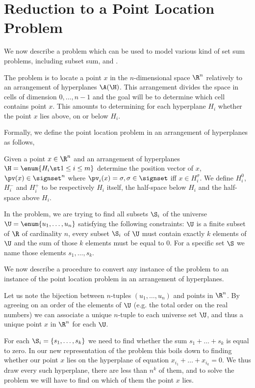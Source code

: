 \section{Reduction to a Point Location Problem}

We now describe a problem which can be used to model
various kind of set sum problems, including subset sum, \kSUM and \kLDT.

The problem is to locate a point \(x\) in the \(n\)-dimensional space \(\R^n\) relatively
to an arrangement of hyperplanes \(\A(\H)\). This arrangement divides the space
in cells of dimension \(0,\ldots,n-1\) and the goal will be to determine which
cell contains point \(x\). This amounts to determining for each
hyperplane \(H_i\) whether the point \(x\) lies above, on or below \(H_i\).

Formally, we define the point location problem in an arrangement of hyperplanes as
follows,

\begin{problem}
Given a point $x \in \R^n$ and an arrangement of hyperplanes $\H = \enum{ H_i
\st 1 \leq i \leq m }$ determine the position vector of $x$, $\pv(x) \in
\signset^n$ where $\pv_i(x) = \sigma, \sigma \in \signset$ iff $x \in
H_i^{\sigma}$. We define $H_i^{0}$, $H_i^{-}$ and $H_i^{+}$ to be
respectively $H_i$ itself, the half-space below $H_i$ and the half-space above
$H_i$.
\end{problem}

In the \kSUM problem, we are trying to find all subsets \(\S_i\) of the universe
\(\U = \enum{u_1,\ldots,u_n}\) satisfying the following constraints: \(\U\) is a finite subset of \(\R\) of
cardinality \(n\), every subset $\S_i$ of $\U$ must contain exactly
$k$ elements of $\U$ and the sum of those $k$ elements must be equal to $0$.
For a specific set $\S$ we name those elements $s_1, \dots, s_k$.

We now describe a procedure to convert any instance of the \kSUM problem to an
instance of the point location problem in an arrangement of hyperplanes.

Let us note the bijection between $n$-tuples $(u_1, \ldots, u_n)$ and points in
$\R^n$. By agreeing on an order of the elements of $\U$ (e.g. the total order on
the real numbers) we can associate a unique $n$-tuple to each universe set $\U$,
and thus a unique point $x$ in $\R^n$ for each $\U$.

For each $\S_i = \left\{s_1, \dots, s_k\right\}$ we need to find whether the sum $s_1
+ \dots + s_k$ is equal to zero. In our new representation of the problem this
boils down to finding whether our point $x$ lies on the hyperplane of
equation $x_{i_1} + \dots + x_{i_k} = 0$. We thus draw every such hyperplane,
there are less than $n^k$ of them, and to solve the problem
we will have to find on which of them the point $x$ lies.

